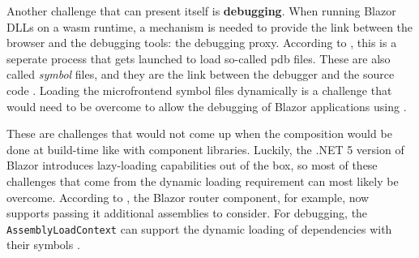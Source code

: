 Another challenge that can present itself is \textbf{debugging}. When running
Blazor DLLs on a \gls{wasm} runtime, a mechanism is needed to provide the link
between the browser and the debugging tools: the debugging proxy. According to
\textcite{Abdalla_2020}, this is a seperate process that gets launched to load
so-called \gls{pdb} files. These are also called \textit{symbol} files, and they
are the link between the debugger and the source code \autocite{Microsoft_2021}.
Loading the \gls{microfrontend} symbol files dynamically is a challenge that
would need to be overcome to allow the debugging of Blazor applications using
.

These are challenges that would not come up when the composition would be done
at build-time like with component libraries. Luckily, the .NET 5 version of
Blazor introduces lazy-loading capabilities out of the
box, so most of these challenges that come from the dynamic loading
requirement can most likely be overcome. According to \textcite{Kdouh_2020}, the
Blazor router component, for example, now supports passing it additional
assemblies to consider. For debugging, the \texttt{AssemblyLoadContext} can
support the dynamic loading of dependencies with their symbols
\autocite{Microsoft_2019}. 